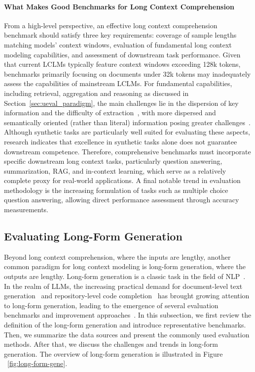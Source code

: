 \documentclass[11pt, a4paper, logo, copyright, nonumbering]{map}
\begin{document}
\paragraph{What Makes Good Benchmarks for Long Context Comprehension} From a high-level perspective, an effective long context comprehension benchmark should satisfy three key requirements: coverage of sample lengths matching models' context windows, evaluation of fundamental long context modeling capabilities, and assessment of downstream task performance. Given that current LCLMs typically feature context windows exceeding 128k tokens, benchmarks primarily focusing on documents under 32k tokens may inadequately assess the capabilities of mainstream LCLMs. For fundamental capabilities, including retrieval, aggregation and reasoning as discussed in Section~\ref{sec:ueval_paradigm}, the main challenges lie in the dispersion of key information and the difficulty of extraction~\citep{goldman2024really}, with more dispersed and semantically oriented (rather than literal) information posing greater challenges~\citep{modarressi2025nolima}. Although synthetic tasks are particularly well suited for evaluating these aspects, research indicates that excellence in synthetic tasks alone does not guarantee downstream competence. Therefore, comprehensive benchmarks must incorporate specific downstream long context tasks, particularly question answering, summarization, RAG, and in-context learning, which serve as a relatively complete proxy for real-world applications. A final notable trend in evaluation methodology is the increasing formulation of tasks such as multiple choice question answering, allowing direct performance assessment through accuracy measurements.


\subsection{Evaluating Long-Form Generation}

Beyond long context comprehension, where the inputs are lengthy, another common paradigm for long context modeling is long-form generation, where the outputs are lengthy. Long-form generation is a classic task in the field of NLP~\citep{wiseman2017challenges,bosselut2018discourse,cho2018towards}. In the realm of LLMs, the increasing practical demand for document-level text generation~\citep{yuan2022wordcraft,venkatraman2024collabstory,luo2024repoagent} and repository-level code completion~\citep{liu2024stall+,wang2024teaching} has brought growing attention to long-form generation, leading to the emergence of several evaluation benchmarks and improvement approaches~\citep{que2024hellobench,bai2024longwriter}. In this subsection, we first review the definition of the long-form generation and introduce representative benchmarks. Then, we summarize the data sources and present the commonly used evaluation methods. After that, we discuss the challenges and trends in long-form generation. The overview of long-form generation is illustrated in Figure ~\ref{fig:long-form-gene}.
\end{document}
